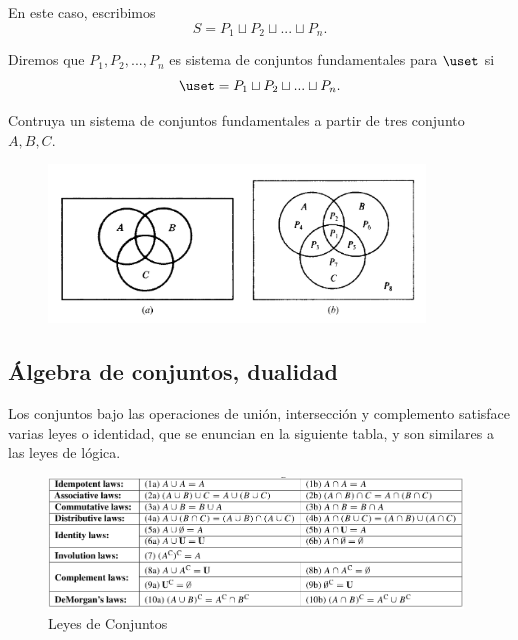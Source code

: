 En este caso, escribimos
$$
S=P_{1}\sqcup P_{2}\sqcup...\sqcup P_{n}.
$$



Diremos que $P_{1}, P_{2},...,P_{n}$ es sistema de conjuntos fundamentales para $\uset$ si
$$
\uset = P_{1}\sqcup P_{2}\sqcup...\sqcup P_{n}.
$$



\begin{problema}
\label{lip:exmo:1.6}
Contruya un sistema de conjuntos fundamentales a partir de tres conjunto $A, B, C.$  
\end{problema}



\begin{figure}
\centering
\includegraphics[width=10cm,keepaspectratio=true]{./md/sistema_fundamental.png}
\label{fig:0105}
\end{figure}




\subsection{Álgebra de conjuntos, dualidad}


	Los conjuntos bajo las operaciones de unión, intersección y complemento satisface varias leyes o identidad, que se enuncian en la siguiente tabla, y son similares a las leyes de lógica.



	\begin{figure}
		\centering
		\includegraphics[width=11cm,keepaspectratio=true]{./md/leyes_conjuntos.png}
		\caption{Leyes de Conjuntos}
		\label{fig:leyesconjuntos}
	\end{figure}
	



